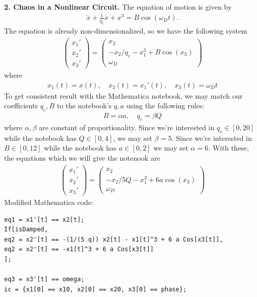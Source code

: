 \documentclass{article}
\theoremstyle{definition}
\newcommand{\al}{\alpha}
\newcommand{\be}{\beta}
\newcommand{\f}[2]{\frac{#1}{#2}}
\begin{document}
\noindent \textbf{2. Chaos in a Nonlinear Circuit.} The equation of motion is given by 
\begin{align*}
\ddot{x} + \f{1}{q_c} \dot x + x^3 = B\cos (\omega_D t).
\end{align*}
The equation is already non-dimensionalized, so we have the following system
\begin{align*}
\begin{pmatrix}
x_1' \\ x_2' \\ x_3'
\end{pmatrix}
= 
\begin{pmatrix}
x_2 \\ 
-x_2/q_c - x_1^3 + B\cos(x_3) \\
\omega_D
\end{pmatrix}
\end{align*}
where
\begin{align*}
x_1(t) = x(t), \quad x_2(t) = x_1'(t), \quad x_3(t) = \omega_D t
\end{align*}
To get consistent result with the Mathematica notebook, we may match our coefficients $q_c, B$ to the notebook's $q,a$ using the following rules:
\begin{align*}
B = \al a, \quad q_c = \be Q
\end{align*}
where $\al,\be$ are constant of proportionality. Since we're interested in $q_c \in [0,20]$ while the notebook has $Q\in [0,4]$, we may set $\be = 5$. Since we're interested in $B \in [0,12]$ while the notebook has $a\in [0,2]$ we may set $\al = 6$. With these, the equations which we will give the notenook are
\begin{align*}
\begin{pmatrix}
x_1' \\ x_2' \\ x_3'
\end{pmatrix}
= 
\begin{pmatrix}
x_2 \\ 
-x_2/5Q - x_1^3 + 6a\cos(x_3) \\
\omega_D
\end{pmatrix}
\end{align*}
Modified Mathematica code:
\begin{lstlisting}
eq1 = x1'[t] == x2[t];
If[isDamped,
eq2 = x2'[t] == -(1/(5 q)) x2[t] - x1[t]^3 + 6 a Cos[x3[t]],
eq2 = x2'[t] == -x1[t]^3 + 6 a Cos[x3[t]]
];

eq3 = x3'[t] == omega;
ic = {x1[0] == x10, x2[0] == x20, x3[0] == phase};
\end{lstlisting}
\end{document}
